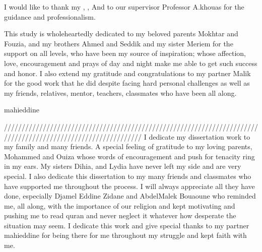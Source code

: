 I would like to thank my , , And to our supervisor Professor A.khouas for the guidance and professionalism.

This study is wholeheartedly dedicated to my beloved parents Mokhtar and Fouzia, and my brothers Ahmed and Seddik and my sister Meriem for the support on all levels, who have been my
source of inspiration; whose affection, love,
encouragement and prays of day and night make me able to get such success and honor.
I also extend my gratitude and congratulations to my partner Malik for the good work that he did despite facing hard personal challenges as well as my friends, relatives, mentor, teachers, classmates who have been all along.

mahieddine

///////////////////////////////////////////////////////////////////////////////////////////////////////////////
I dedicate my dissertation work to my family and many friends. A special
feeling of gratitude to my loving parents, Mohammed and Ouiza  whose
words of encouragement and push for tenacity ring in my ears. My sisters Dihia,
and Lydia have never left my side and are very special.
 I also dedicate this dissertation to my many friends and classmates who have
supported me throughout the process. I will always appreciate all they have done,
especially Djamel Eddine Zidane and AbdelMalek Bouaoune who reminded me, all along, with the importance of our religion and kept motivating
and pushing me to read quran and never neglect it whatever how desperate the situation may seem.
 I dedicate this work and give special thanks to my partner mahieddine for being there for me throughout my struggle and kept faith with me.
